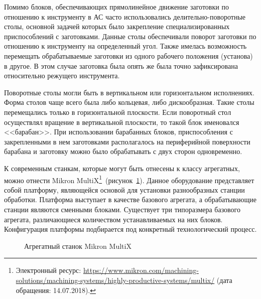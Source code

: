 Помимо блоков, обеспечивающих прямолинейное движение заготовки по отношению к инструменту в АС часто использовались делительно-поворотные столы, основной задачей которых было закрепление специализированных приспособлений с заготовками. Данные столы обеспечивали поворот заготовки по отношению к инструменту на определенный угол. Также имелась возможность перемещать обрабатываемые заготовки из одного рабочего положения (установа) в другое. В этом случае заготовка была опять же была точно зафиксирована относительно режущего инструмента. 

Поворотные столы могли быть в вертикальном или горизонтальном исполнениях. Форма столов чаще всего была либо кольцевая, либо дискообразная. Такие столы перемещались только в горизонтальной плоскости. Если поворотный стол осуществлял вращение в вертикальной плоскости, то такой блок именовался <<барабан>>. При использовании барабанных блоков, приспособления с закрепленными в нем заготовками располагалось на периферийной поверхности барабана и заготовку можно было обрабатывать с двух сторон одновременно.

К современным станкам, которые могут быть отнесены к классу агрегатных, можно отнести Mikron MultiX\footnote{Электронный ресурс: {\small\url{https://www.mikron.com/machining-solutions/machining-systems/highly-productive-systems/multix/}} (дата обращения: 14.07.2018).}~(рисунок~\cref{fig:mikron}). Данное оборудование представляет собой платформу, являющейся основой для установки разнообразных станции обработки. Платформа выступает в качестве базового агрегата, а обрабатывающие станции являются сменными блоками. Существует три типоразмера базового агрегата, различающиеся количеством устанавливаемых на них блоков. Конфигурация платформы подбирается под конкретный технологический процесс.

\begin{figure}[ht]
	\caption{Агрегатный станок Mikron MultiX}\label{fig:mikron}
\end{figure}


